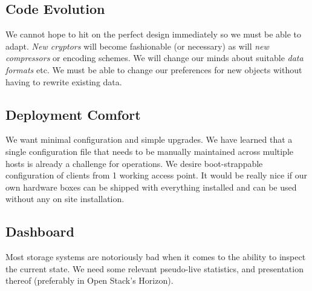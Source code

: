 \subsection{Code Evolution}
We cannot hope to hit on the perfect design immediately so
we must be able to adapt.
\emph{New cryptors} will become fashionable (or necessary) as will \emph{new compressors} or encoding schemes.
We will change our minds about suitable \emph{data formats} etc.
We must be able to change our preferences for new objects without having to
rewrite existing data.

\subsection{Deployment Comfort}
We want minimal configuration and simple upgrades.
We have learned that a single configuration file that needs to be
manually maintained across multiple hosts is already a challenge for operations.
We desire boot-strappable configuration of clients from 1 working access point.
It would be really nice if our own hardware boxes can be shipped with everything installed and can be used without any on site installation.

\subsection{Dashboard}
Most storage systems are notoriously bad when it comes to the ability
to inspect the current state.
We need some relevant pseudo-live statistics, and presentation thereof
(preferably in Open Stack's Horizon).
